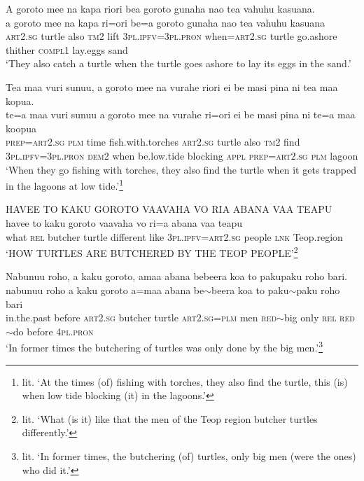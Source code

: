 \ea\label{ex:text19-28}
A goroto mee na kapa riori bea goroto gunaha nao tea vahuhu kasuana.\\
\gll a	goroto	mee	na	kapa	ri=ori	be=a	goroto	gunaha	nao	tea	vahuhu	kasuana\\
     \textsc{art}2.\textsc{sg}	turtle	also	\textsc{tm}2	lift	3\textsc{pl}.\textsc{ipfv}=3\textsc{pl}.\textsc{pron}	when=\textsc{art}2.\textsc{sg}	turtle	go.ashore	thither	\textsc{compl}1	lay.eggs	sand\\
\glt `They also catch a turtle when the turtle goes ashore to lay its eggs in the sand.'
\z

\ea\label{ex:text19-29}
Tea maa vuri sunuu, a goroto mee na vurahe riori ei be masi pina ni tea maa kopua.\\
\gll te=a	maa	vuri	sunuu	a	goroto	mee	na	vurahe	ri=ori	ei	be	masi	pina	ni	te=a	maa	koopua\\
     \textsc{prep}=\textsc{art}2.\textsc{sg}	\textsc{plm}	time	fish.with.torches	\textsc{art}2.\textsc{sg}	turtle	also	\textsc{tm}2	find	3\textsc{pl}.\textsc{ipfv}=3\textsc{pl}.\textsc{pron}	\textsc{dem}2	when	be.low.tide	blocking	\textsc{appl}	\textsc{prep}=\textsc{art}2.\textsc{sg}	\textsc{plm}	lagoon\\
\glt `When they go fishing with torches, they also find the turtle when it gets trapped in the lagoons at low tide.'\footnote{lit. `At the times (of) fishing with torches, they also find the turtle, this (is) when low tide blocking (it) in the lagoons.'}
\z

\ea\label{ex:text19-30}
HAVEE TO KAKU GOROTO VAAVAHA VO RIA ABANA VAA TEAPU\\
\gll havee	to	kaku	goroto	vaavaha	vo	ri=a	abana	vaa	teapu\\
     what	\textsc{rel}	butcher	turtle	different	like	3\textsc{pl}.\textsc{ipfv}=\textsc{art}2.\textsc{sg}	people	\textsc{lnk}	Teop.region\\
\glt `HOW TURTLES ARE BUTCHERED BY THE TEOP PEOPLE'\footnote{lit. `What (is it) like that the men of the Teop region butcher turtles differently.'}
\z

\ea\label{ex:text19-31}
Nabunuu roho, a kaku goroto, amaa abana bebeera koa to pakupaku roho bari.\\
\gll nabunuu	roho	a	kaku	goroto	a=maa	abana	be{$\sim$}beera	koa	to	paku{$\sim$}paku	roho	bari\\
     in.the.past	before	\textsc{art}2.\textsc{sg}	butcher	turtle	\textsc{art}2.\textsc{sg}=\textsc{plm}	men	\textsc{red}{$\sim$}big	only	\textsc{rel}	\textsc{red}{$\sim$}do	before	4\textsc{pl}.\textsc{pron}\\
\glt `In former times the butchering of turtles was only done by the big men.'\footnote{lit. `In former times, the butchering (of) turtles, only big men (were the ones) who did it.'}
\z

